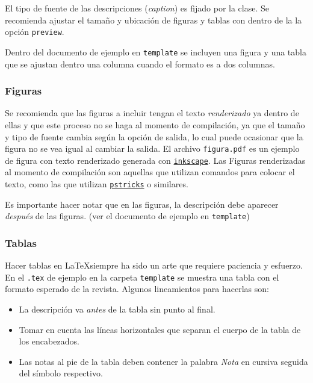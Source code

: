 \documentclass{article}
\begin{document}
El tipo de fuente de las descripciones (\emph{caption}) es fijado por la clase. Se recomienda ajustar el tamaño y ubicación de figuras y tablas con dentro de la la opción \texttt{preview}.

Dentro del documento de ejemplo en \texttt{template} se incluyen una figura y una tabla que se ajustan dentro una columna cuando el formato es a dos columnas. 

\subsubsection{Figuras}
Se recomienda que las figuras a incluir tengan el texto \emph{renderizado} ya dentro de ellas y que este proceso no se haga al momento de compilación, ya que el tamaño y tipo de fuente cambia según la opción de salida, lo cual puede ocasionar que la figura no se vea igual al cambiar la salida. El archivo \texttt{figura.pdf} es un ejemplo de figura con texto renderizado generada con \href{https://inkscape.org}{\texttt{inkscape}}. Las Figuras renderizadas al momento de compilación son aquellas que utilizan comandos para colocar el texto, como las que utilizan \href{http://tug.org/PSTricks/main.cgi/}{\texttt{pstricks}} o similares.

Es importante hacer notar que en las figuras, la descripción debe aparecer \emph{después} de las figuras. (ver el documento de ejemplo en \texttt{template})

\subsubsection{Tablas}
Hacer tablas en \LaTeX siempre ha sido un arte que requiere paciencia y esfuerzo. En el \texttt{.tex} de ejemplo en la carpeta \texttt{template} se muestra una tabla con el formato esperado de la revista. Algunos lineamientos para hacerlas son:
\begin{itemize}
\item La descripción va \emph{antes} de la tabla sin punto al final.
\item Tomar en cuenta las líneas horizontales que separan el cuerpo de la tabla de los encabezados.
\item Las notas al pie de la tabla deben contener la palabra \emph{Nota} en cursiva seguida del símbolo respectivo.
\end{itemize}
\end{document}
